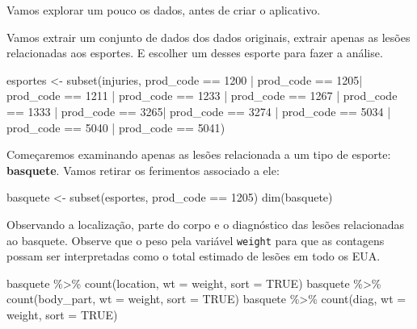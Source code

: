 \documentclass[
]{book}
\newenvironment{Shaded}{\begin{snugshade}}{\end{snugshade}}
\newcommand{\AttributeTok}[1]{\textcolor[rgb]{0.77,0.63,0.00}{#1}}
\newcommand{\ConstantTok}[1]{\textcolor[rgb]{0.00,0.00,0.00}{#1}}
\newcommand{\DecValTok}[1]{\textcolor[rgb]{0.00,0.00,0.81}{#1}}
\newcommand{\FunctionTok}[1]{\textcolor[rgb]{0.00,0.00,0.00}{#1}}
\newcommand{\NormalTok}[1]{#1}
\newcommand{\OtherTok}[1]{\textcolor[rgb]{0.56,0.35,0.01}{#1}}
\newcommand{\SpecialCharTok}[1]{\textcolor[rgb]{0.00,0.00,0.00}{#1}}
\begin{document}
Vamos explorar um pouco os dados, antes de criar o aplicativo.

Vamos extrair um conjunto de dados dos dados originais, extrair apenas as lesões relacionadas aos esportes. E escolher um desses esporte para fazer a análise.

\begin{Shaded}
\begin{Highlighting}[]
\NormalTok{esportes }\OtherTok{\textless{}{-}} \FunctionTok{subset}\NormalTok{(injuries, prod\_code }\SpecialCharTok{==} \DecValTok{1200} \SpecialCharTok{|}\NormalTok{ prod\_code }\SpecialCharTok{==} \DecValTok{1205}\SpecialCharTok{|}\NormalTok{ prod\_code }\SpecialCharTok{==} \DecValTok{1211} \SpecialCharTok{|}
\NormalTok{                   prod\_code }\SpecialCharTok{==} \DecValTok{1233} \SpecialCharTok{|}\NormalTok{ prod\_code }\SpecialCharTok{==} \DecValTok{1267} \SpecialCharTok{|}\NormalTok{ prod\_code }\SpecialCharTok{==} \DecValTok{1333} \SpecialCharTok{|}\NormalTok{ prod\_code }\SpecialCharTok{==} \DecValTok{3265}\SpecialCharTok{|}
\NormalTok{                     prod\_code }\SpecialCharTok{==} \DecValTok{3274} \SpecialCharTok{|}\NormalTok{ prod\_code }\SpecialCharTok{==} \DecValTok{5034} \SpecialCharTok{|}\NormalTok{ prod\_code }\SpecialCharTok{==} \DecValTok{5040} \SpecialCharTok{|}\NormalTok{ prod\_code }\SpecialCharTok{==} \DecValTok{5041}\NormalTok{)}
\end{Highlighting}
\end{Shaded}

Começaremos examinando apenas as lesões relacionada a um tipo de esporte: \textbf{basquete}. Vamos retirar os ferimentos associado a ele:

\begin{Shaded}
\begin{Highlighting}[]
\NormalTok{basquete }\OtherTok{\textless{}{-}} \FunctionTok{subset}\NormalTok{(esportes, prod\_code }\SpecialCharTok{==} \DecValTok{1205}\NormalTok{)}
\FunctionTok{dim}\NormalTok{(basquete)}
\end{Highlighting}
\end{Shaded}

Observando a localização, parte do corpo e o diagnóstico das lesões relacionadas ao basquete. Observe que o peso pela variável \texttt{weight} para que as contagens possam ser interpretadas como o total estimado de lesões em todo os EUA.

\begin{Shaded}
\begin{Highlighting}[]
\NormalTok{basquete }\SpecialCharTok{\%\textgreater{}\%}  \FunctionTok{count}\NormalTok{(location, }\AttributeTok{wt =}\NormalTok{ weight, }\AttributeTok{sort =} \ConstantTok{TRUE}\NormalTok{) }
\NormalTok{basquete }\SpecialCharTok{\%\textgreater{}\%}  \FunctionTok{count}\NormalTok{(body\_part, }\AttributeTok{wt =}\NormalTok{ weight, }\AttributeTok{sort =} \ConstantTok{TRUE}\NormalTok{) }
\NormalTok{basquete }\SpecialCharTok{\%\textgreater{}\%}  \FunctionTok{count}\NormalTok{(diag, }\AttributeTok{wt =}\NormalTok{ weight, }\AttributeTok{sort =} \ConstantTok{TRUE}\NormalTok{) }
\end{Highlighting}
\end{Shaded}
\end{document}
